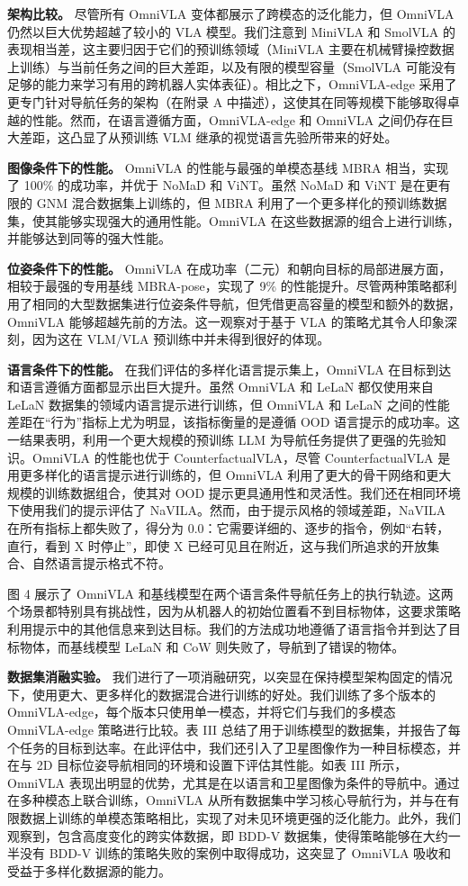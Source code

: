 \textbf{架构比较。} 尽管所有 OmniVLA 变体都展示了跨模态的泛化能力，但 OmniVLA 仍然以巨大优势超越了较小的 VLA 模型。我们注意到 MiniVLA 和 SmolVLA 的表现相当差，这主要归因于它们的预训练领域（MiniVLA 主要在机械臂操控数据上训练）与当前任务之间的巨大差距，以及有限的模型容量（SmolVLA 可能没有足够的能力来学习有用的跨机器人实体表征）。相比之下，OmniVLA-edge 采用了更专门针对导航任务的架构（在附录 A 中描述），这使其在同等规模下能够取得卓越的性能。然而，在语言遵循方面，OmniVLA-edge 和 OmniVLA 之间仍存在巨大差距，这凸显了从预训练 VLM 继承的视觉语言先验所带来的好处。

\textbf{图像条件下的性能。} OmniVLA 的性能与最强的单模态基线 MBRA 相当，实现了 100\% 的成功率，并优于 NoMaD 和 ViNT。虽然 NoMaD 和 ViNT 是在更有限的 GNM 混合数据集上训练的，但 MBRA 利用了一个更多样化的预训练数据集，使其能够实现强大的通用性能。OmniVLA 在这些数据源的组合上进行训练，并能够达到同等的强大性能。

\textbf{位姿条件下的性能。} OmniVLA 在成功率（二元）和朝向目标的局部进展方面，相较于最强的专用基线 MBRA-pose，实现了 9\% 的性能提升。尽管两种策略都利用了相同的大型数据集进行位姿条件导航，但凭借更高容量的模型和额外的数据，OmniVLA 能够超越先前的方法。这一观察对于基于 VLA 的策略尤其令人印象深刻，因为这在 VLM/VLA 预训练中并未得到很好的体现。

\textbf{语言条件下的性能。} 在我们评估的多样化语言提示集上，OmniVLA 在目标到达和语言遵循方面都显示出巨大提升。虽然 OmniVLA 和 LeLaN 都仅使用来自 LeLaN 数据集的领域内语言提示进行训练，但 OmniVLA 和 LeLaN 之间的性能差距在“行为”指标上尤为明显，该指标衡量的是遵循 OOD 语言提示的成功率。这一结果表明，利用一个更大规模的预训练 LLM 为导航任务提供了更强的先验知识。OmniVLA 的性能也优于 CounterfactualVLA，尽管 CounterfactualVLA 是用更多样化的语言提示进行训练的，但 OmniVLA 利用了更大的骨干网络和更大规模的训练数据组合，使其对 OOD 提示更具通用性和灵活性。我们还在相同环境下使用我们的提示评估了 NaVILA。然而，由于提示风格的领域差距，NaVILA 在所有指标上都失败了，得分为 0.0：它需要详细的、逐步的指令，例如“右转，直行，看到 X 时停止”，即使 X 已经可见且在附近，这与我们所追求的开放集合、自然语言提示格式不符。

图 4 展示了 OmniVLA 和基线模型在两个语言条件导航任务上的执行轨迹。这两个场景都特别具有挑战性，因为从机器人的初始位置看不到目标物体，这要求策略利用提示中的其他信息来到达目标。我们的方法成功地遵循了语言指令并到达了目标物体，而基线模型 LeLaN 和 CoW 则失败了，导航到了错误的物体。

\textbf{数据集消融实验。} 我们进行了一项消融研究，以突显在保持模型架构固定的情况下，使用更大、更多样化的数据混合进行训练的好处。我们训练了多个版本的 OmniVLA-edge，每个版本只使用单一模态，并将它们与我们的多模态 OmniVLA-edge 策略进行比较。表 III 总结了用于训练模型的数据集，并报告了每个任务的目标到达率。在此评估中，我们还引入了卫星图像作为一种目标模态，并在与 2D 目标位姿导航相同的环境和设置下评估其性能。如表 III 所示，OmniVLA 表现出明显的优势，尤其是在以语言和卫星图像为条件的导航中。通过在多种模态上联合训练，OmniVLA 从所有数据集中学习核心导航行为，并与在有限数据上训练的单模态策略相比，实现了对未见环境更强的泛化能力。此外，我们观察到，包含高度变化的跨实体数据，即 BDD-V 数据集，使得策略能够在大约一半没有 BDD-V 训练的策略失败的案例中取得成功，这突显了 OmniVLA 吸收和受益于多样化数据源的能力。

